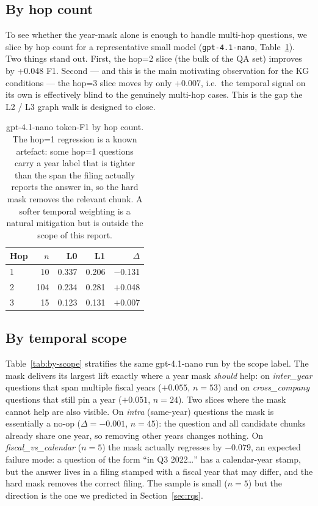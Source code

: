 \documentclass[11pt]{article}
\begin{document}
\subsection{By hop count}
\label{sec:r-hop}
To see whether the year-mask alone is enough to handle multi-hop
questions, we slice by hop count for a representative small model
(\texttt{gpt-4.1-nano}, Table~\ref{tab:by-hop}). Two things stand
out. First, the hop=2 slice (the bulk of the QA set) improves by
+0.048 F1. Second --- and this is the main motivating observation
for the KG conditions --- the hop=3 slice moves by only +0.007,
i.e.\ the temporal signal on its own is effectively blind to the
genuinely multi-hop cases. This is the gap the L2 / L3 graph walk
is designed to close.

\begin{table}[h]
\centering
\small
\begin{tabular}{lr rr r}
\toprule
Hop & $n$ & L0    & L1    & $\Delta$ \\
\midrule
1   &  10 & 0.337 & 0.206 & $-$0.131 \\
2   & 104 & 0.234 & 0.281 & $+$0.048 \\
3   &  15 & 0.123 & 0.131 & $+$0.007 \\
\bottomrule
\end{tabular}
\caption{gpt-4.1-nano token-F1 by hop count.
The hop=1 regression is a known artefact: some hop=1 questions carry
a year label that is tighter than the span the filing actually
reports the answer in, so the hard mask removes the relevant chunk.
A softer temporal weighting is a natural mitigation but is outside
the scope of this report.}
\label{tab:by-hop}
\end{table}

\subsection{By temporal scope}
\label{sec:r-scope}
Table~\ref{tab:by-scope} stratifies the same gpt-4.1-nano run by the
scope label. The mask delivers its largest lift exactly where a year
mask \emph{should} help: on \textit{inter\_year} questions that span
multiple fiscal years ($+0.055$, $n=53$) and on \textit{cross\_company}
questions that still pin a year ($+0.051$, $n=24$). Two slices where
the mask cannot help are also visible. On \textit{intra} (same-year)
questions the mask is essentially a no-op ($\Delta=-0.001$, $n=45$):
the question and all candidate chunks already share one year, so
removing other years changes nothing. On \textit{fiscal\_vs\_calendar}
($n=5$) the mask actually regresses by $-0.079$, an expected
failure mode: a question of the form ``in Q3 2022\ldots'' has a
calendar-year stamp, but the answer lives in a filing stamped with a
fiscal year that may differ, and the hard mask removes the correct
filing. The sample is small ($n=5$) but the direction is the one we
predicted in Section~\ref{sec:rqs}.
\end{document}
